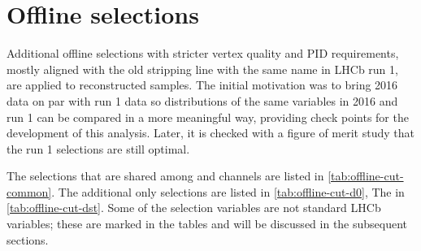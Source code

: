 \section{Offline selections}
\label{ref:selection:offline}

Additional offline selections with stricter vertex quality and PID requirements,
mostly aligned with the old stripping line with the same name in LHCb run 1,
are applied to reconstructed samples.
The initial motivation was to bring 2016 data on par with run 1 data so
distributions of the same variables in 2016 and run 1 can be compared in a more
meaningful way,
providing check points for the development of this analysis.
Later, it is checked with a figure of merit study that the run 1 selections
are still optimal.

The selections that are shared among \Dz and \Dstar channels are listed in
\cref{tab:offline-cut-common}.
The additional \Dz only selections are listed in \cref{tab:offline-cut-d0},
The \Dstar in \cref{tab:offline-cut-dst}.
Some of the selection variables are not standard LHCb variables;
these are marked in the tables and will be discussed in the subsequent sections.

